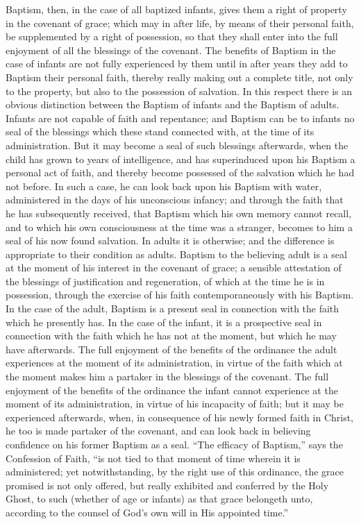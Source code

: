 \documentclass[]{book}
\begin{document}
Baptism, then, in the case of all baptized infants, gives them a right of property in the covenant of grace; which may in after life, by means of their personal faith, be supplemented by a right of possession, so that they shall enter into the full enjoyment of all the blessings of the covenant. The benefits of Baptism in the case of infants are not fully experienced by them until in after years they add to Baptism their personal faith, thereby really making out a complete title, not only to the property, but also to the possession of salvation. In this respect there is an obvious distinction between the Baptism of infants and the Baptism of adults. Infants are not capable of faith and repentance; and Baptism can be to infants no seal of the blessings which these stand connected with, at the time of its administration. But it may become a seal of such blessings afterwards, when the child has grown to years of intelligence, and has superinduced upon his Baptism a personal act of faith, and thereby become possessed of the salvation which he had not before. In such a case, he can look back upon his Baptism with water, administered in the days of his unconscious infancy; and through the faith that he has subsequently received, that Baptism which his own memory cannot recall, and to which his own consciousness at the time was a stranger, becomes to him a seal of his now found salvation. In adults it is otherwise; and the difference is appropriate to their condition as adults. Baptism to the believing adult is a seal at the moment of his interest in the covenant of grace; a sensible attestation of the blessings of justification and regeneration, of which at the time he is in possession, through the exercise of his faith contemporaneously with his Baptism. In the case of the adult, Baptism is a present seal in connection with the faith which he presently has. In the case of the infant, it is a prospective seal in connection with the faith which he has not at the moment, but which he may have afterwards. The full enjoyment of the benefits of the ordinance the adult experiences at the moment of its administration, in virtue of the faith which at the moment makes him a partaker in the blessings of the covenant. The full enjoyment of the benefits of the ordinance the infant cannot experience at the moment of its administration, in virtue of his incapacity of faith; but it may be experienced afterwards, when, in consequence of his newly formed faith in Christ, he too is made partaker of the covenant, and can look back in believing confidence on his former Baptism as a seal. ``The efficacy of Baptism,'' says the Confession of Faith, ``is not tied to that moment of time wherein it is administered; yet notwithstanding, by the right use of this ordinance, the grace promised is not only offered, but really exhibited and conferred by the Holy Ghost, to such (whether of age or infants) as that grace belongeth unto, according to the counsel of God's own will in His appointed time.''
\end{document}
